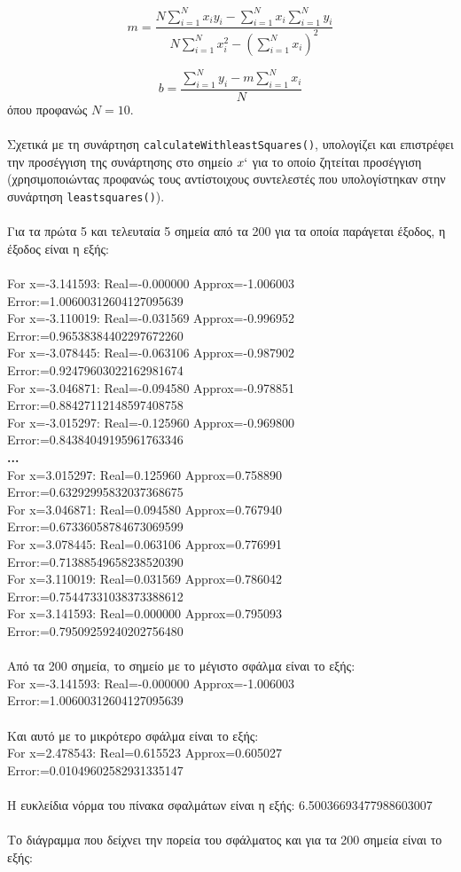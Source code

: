 \documentclass[a4paper, 14pt]{article}   %
\begin{document}
$$m = \frac{{N \sum_{i=1}^{N} x_i y_i - \sum_{i=1}^{N} x_i \sum_{i=1}^{N} y_i}}{{N \sum_{i=1}^{N} x_i^2 - \left(\sum_{i=1}^{N} x_i\right)^2}}$$

$$b = \frac{{\sum_{i=1}^{N} y_i - m \sum_{i=1}^{N} x_i}}{{N}}$$
όπου προφανώς $N=10$.\\\\
Σχετικά με τη συνάρτηση \texttt{calculateWithleastSquares()}, υπολογίζει και επιστρέφει την προσέγγιση της συνάρτησης στο σημείο $x`$ για το οποίο ζητείται προσέγγιση (χρησιμοποιώντας προφανώς τους αντίστοιχους συντελεστές που υπολογίστηκαν στην συνάρτηση \texttt{least\textunderscore squares()}).\\\\
Για τα πρώτα 5 και τελευταία 5 σημεία από τα 200 για τα οποία παράγεται έξοδος, η έξοδος είναι η εξής:\\\\
For x=-3.141593: Real=-0.000000 Approx=-1.006003 Error:=1.00600312604127095639\\
For x=-3.110019: Real=-0.031569 Approx=-0.996952 Error:=0.96538384402297672260\\
For x=-3.078445: Real=-0.063106 Approx=-0.987902 Error:=0.92479603022162981674\\
For x=-3.046871: Real=-0.094580 Approx=-0.978851 Error:=0.88427112148597408758\\
For x=-3.015297: Real=-0.125960 Approx=-0.969800 Error:=0.84384049195961763346\\
{\large\textbf{...}}\\
For x=3.015297: Real=0.125960 Approx=0.758890 Error:=0.63292995832037368675\\
For x=3.046871: Real=0.094580 Approx=0.767940 Error:=0.67336058784673069599\\
For x=3.078445: Real=0.063106 Approx=0.776991 Error:=0.71388549658238520390\\
For x=3.110019: Real=0.031569 Approx=0.786042 Error:=0.75447331038373388612\\
For x=3.141593: Real=0.000000 Approx=0.795093 Error:=0.79509259240202756480\\\\
Από τα 200 σημεία, το σημείο με το μέγιστο σφάλμα είναι το εξής:\\
For x=-3.141593: Real=-0.000000 Approx=-1.006003 Error:=1.00600312604127095639\\\\
Και αυτό με το μικρότερο σφάλμα είναι το εξής:\\
For x=2.478543: Real=0.615523 Approx=0.605027 Error:=0.01049602582931335147\\\\
Η ευκλείδια νόρμα του πίνακα σφαλμάτων είναι η εξής: 6.50036693477988603007\\\\
Το διάγραμμα που δείχνει την πορεία του σφάλματος και για τα 200 σημεία είναι το εξής:
\end{document}
